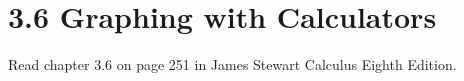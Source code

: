%
%

\section*{3.6 Graphing with Calculators}

Read chapter 3.6 on page 251 in James Stewart Calculus Eighth Edition. 
